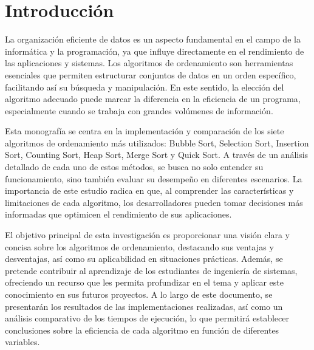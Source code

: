 
\section*{Introducción}


La organización eficiente de datos es un aspecto fundamental en el campo de la informática y la programación, ya que influye directamente en el rendimiento de las aplicaciones y sistemas. Los algoritmos de ordenamiento son herramientas esenciales que permiten estructurar conjuntos de datos en un orden específico, facilitando así su búsqueda y manipulación. En este sentido, la elección del algoritmo adecuado puede marcar la diferencia en la eficiencia de un programa, especialmente cuando se trabaja con grandes volúmenes de información.

Esta monografía se centra en la implementación y comparación de los siete algoritmos de ordenamiento más utilizados: Bubble Sort, Selection Sort, Insertion Sort, Counting Sort, Heap Sort, Merge Sort y Quick Sort. A través de un análisis detallado de cada uno de estos métodos, se busca no solo entender su funcionamiento, sino también evaluar su desempeño en diferentes escenarios. La importancia de este estudio radica en que, al comprender las características y limitaciones de cada algoritmo, los desarrolladores pueden tomar decisiones más informadas que optimicen el rendimiento de sus aplicaciones.

El objetivo principal de esta investigación es proporcionar una visión clara y concisa sobre los algoritmos de ordenamiento, destacando sus ventajas y desventajas, así como su aplicabilidad en situaciones prácticas. Además, se pretende contribuir al aprendizaje de los estudiantes de ingeniería de sistemas, ofreciendo un recurso que les permita profundizar en el tema y aplicar este conocimiento en sus futuros proyectos. A lo largo de este documento, se presentarán los resultados de las implementaciones realizadas, así como un análisis comparativo de los tiempos de ejecución, lo que permitirá establecer conclusiones sobre la eficiencia de cada algoritmo en función de diferentes variables.









